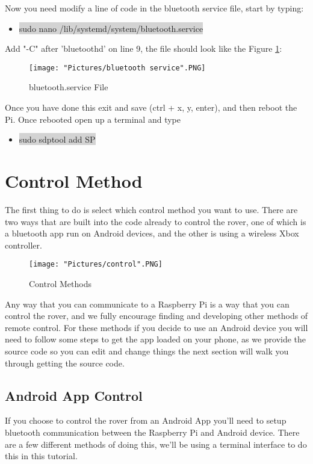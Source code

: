 \documentclass[12pt]{article}
\begin{document}
\noindent Now you need modify a line of code in the bluetooth service file, start by typing:
\begin{itemize}
	\item[] \colorbox{lightgray}{sudo nano /lib/systemd/system/bluetooth.service}
\end{itemize}
\noindent Add "-C" after 'bluetoothd' on line 9, the file should look like the Figure \ref{bs}:

\begin{figure}[H]
 	\centering
	\texttt{[image: "Pictures/bluetooth service".PNG]}
	\caption{bluetooth.service File}
	\label{bs}
\end{figure}
	
\noindent Once you have done this exit and save (ctrl + x, y, enter), and then reboot the Pi. Once rebooted open up a terminal and type
\begin{itemize}
	\item[] \colorbox{lightgray}{sudo sdptool add SP}
\end{itemize}


\section{Control Method}

The first thing to do is select which control method you want to use. There are two ways that are built into the code already to control the rover, one of which is a bluetooth app run on Android devices, and the other is using a wireless Xbox controller. 

\begin{figure}[H]
 	\centering
	\texttt{[image: "Pictures/control".PNG]}
 	\caption{Control Methods}
	\label{controls}
\end{figure}

\noindent Any way that you can communicate to a Raspberry Pi is a way that you can control the rover, and we fully encourage finding and developing other methods of remote control. For these methods if you decide to use an Android device you will need to follow some steps to get the app loaded on your phone, as we provide the source code so you can edit and change things the next section will walk you through getting the source code.

\subsection{Android App Control}
If you choose to control the rover from an Android App you'll need to setup bluetooth communication between the Raspberry Pi and Android device. There are a few different methods of doing this, we'll be using a terminal interface to do this in this tutorial.
\end{document}
